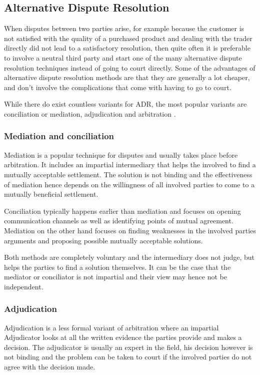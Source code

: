 \documentclass[12pt,msc,a4paper,oneside]{ucl_thesis}
\begin{document}
\subsection{Alternative Dispute Resolution}
When disputes between two parties arise, for example because the customer is not satisfied with the quality of a purchased product and dealing with the trader directly did not lead to a satisfactory resolution, then quite often it is preferable to involve a neutral third party and start one of the many alternative dispute resolution techniques instead of going to court directly. Some of the advantages of alternative dispute resolution methods are that they are generally a lot cheaper, and don't involve the complications that come with having to go to court. \cite{adr_overview:findlaw}

While there do exist countless variants for ADR, the most popular variants are conciliation or mediation, adjudication and arbitration \cite{using_adr:citizensadvice}. 

\subsubsection{Mediation and conciliation}
Mediation is a popular technique for disputes and usually takes place before arbitration. It includes an impartial intermediary that helps the involved to find a mutually acceptable settlement. The solution is not binding and the effectiveness of mediation hence depends on the willingness of all involved parties to come to a mutually beneficial settlement. 

Conciliation typically happens earlier than mediation and focuses on opening communication channels as well as identifying points of mutual agreement. Mediation on the other hand focuses on finding weaknesses in the involved parties arguments and proposing possible mutually acceptable solutions.

Both methods are completely voluntary and the intermediary does not judge, but helps the parties to find a solution themselves. It can be the case that the mediator or conciliator is not impartial and their view may hence not be independent. \cite{using_adr:citizensadvice}

\subsubsection{Adjudication}
Adjudication is a less formal variant of arbitration where an impartial Adjudicator looks at all the written evidence the parties provide and makes a decision. The adjudicator is usually an expert in the field, his decision however is not binding and the problem can be taken to court if the involved parties do not agree with the decision made. \cite{using_adr:citizensadvice}
\end{document}
